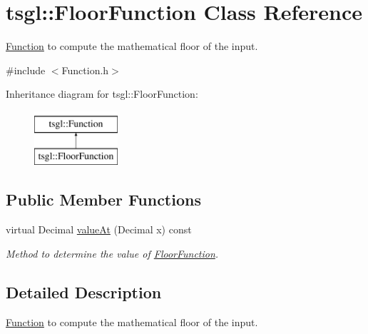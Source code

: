 \hypertarget{classtsgl_1_1_floor_function}{\section{tsgl\-:\-:Floor\-Function Class Reference}
\label{classtsgl_1_1_floor_function}
}


\hyperlink{classtsgl_1_1_function}{Function} to compute the mathematical floor of the input.  




{\ttfamily \#include $<$Function.\-h$>$}

Inheritance diagram for tsgl\-:\-:Floor\-Function\-:\begin{figure}[H]
\begin{center}
\leavevmode
\includegraphics[height=2.000000cm]{classtsgl_1_1_floor_function}
\end{center}
\end{figure}
\subsection*{Public Member Functions}
\begin{DoxyCompactItemize}
\item 
virtual Decimal \hyperlink{classtsgl_1_1_floor_function_a73eedb6a65c55e070541b08c49d9f170}{value\-At} (Decimal x) const 
\begin{DoxyCompactList}\small\item\em Method to determine the value of \hyperlink{classtsgl_1_1_floor_function}{Floor\-Function}. \end{DoxyCompactList}\end{DoxyCompactItemize}


\subsection{Detailed Description}
\hyperlink{classtsgl_1_1_function}{Function} to compute the mathematical floor of the input. 

